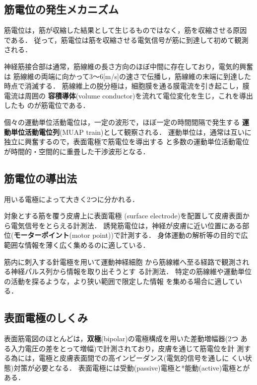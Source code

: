 \documentclass[10pt,twocolumn]{jarticle}
\begin{document}
\subsection{筋電位の発生メカニズム}
筋電位は，筋が収縮した結果として生じるものではなく，筋を収縮させる原因
である．
従って，筋電位は筋を収縮させる電気信号が筋に到達して初めて観測される．

神経筋接合部は通常，筋線維の長さ方向のほぼ中間に存在しており，電気的興奮は
筋線維の両端に向かって3〜6[m/s]の速さで伝播し，筋線維の末端に到達した
時点で消滅する．
筋線維上の脱分極は，細胞膜を通る膜電流を引き起こし，膜電流は周囲の{\bf
  容積導体}(volume conductor)を流れて電位変化を生じ，これを導出したも
のが筋電位である．

個々の運動単位活動電位は，一定の波形で，ほぼ一定の時間間隔で発生する
{\bf 運動単位活動電位列}(MUAP train)として観察される．
運動単位は，通常は互いに独立に興奮するので，表面電極で筋電位を導出する
と多数の運動単位活動電位が時間的・空間的に重畳した干渉波形となる．

\subsection{筋電位の導出法}
用いる電極によって大きく2つに分かれる．
\begin{description}
\item[*表面筋電図(surface EMG)法] 対象とする筋を覆う皮膚上に表面電極
  (surface electrode)を配置して皮膚表面から電気信号をとらえる計測法．
  誘発筋電位は，神経が皮膚に近い位置にある部位({\bf モーターポイント}(motor
  point))で計測する．
  身体運動の解析等の目的で広範囲な情報を薄く広く集めるのに適している．
{\footnotesize\item[針筋電図(needle EMG)法] 筋内に刺入する針電極を用いて運動神経細胞
  から筋線維へ至る経路で観測される神経パルス列から情報を取り出そうとす
  る計測法．
  特定の筋線維や運動単位の活動を探るような，より狭い範囲で限定した情報
  を集める場合に適している．}
\end{description}

\subsection{表面電極のしくみ}
表面筋電図のほとんどは，{\bf 双極}(bipolar)の電極構成を用いた差動増幅器(2つ
ある入力電圧の差をとって増幅)で計測されており，皮膚を通じて筋電位を計
測する為には，電極と皮膚表面間での高インピーダンス(電気的信号を通しに
くい状態)対策が必要となる．
表面電極には受動(passive)電極と*能動(active)電極とがある．
\end{document}
